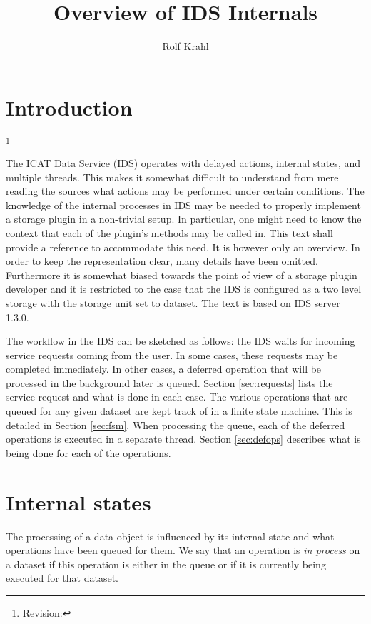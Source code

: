\documentclass[paper=a4]{scrartcl}
\title{Overview of IDS Internals}
\author{Rolf Krahl}
\newcommand{\revhint}{%
  \begingroup%
  \let\thefootnote\relax%
  \footnote{Revision: }%
  \addtocounter{footnote}{-1}%
  \endgroup%
}
\begin{document}
\maketitle

\section{Introduction}

\revhint{}%
The ICAT Data Service (IDS) operates with delayed actions, internal
states, and multiple threads.  This makes it somewhat difficult to
understand from mere reading the sources what actions may be performed
under certain conditions.  The knowledge of the internal processes in
IDS may be needed to properly implement a storage plugin in a
non-trivial setup.  In particular, one might need to know the context
that each of the plugin's methods may be called in.  This text shall
provide a reference to accommodate this need.  It is however only an
overview.  In order to keep the representation clear, many details
have been omitted.  Furthermore it is somewhat biased towards the
point of view of a storage plugin developer and it is restricted to
the case that the IDS is configured as a two level storage with the
storage unit set to dataset.  The text is based on IDS server 1.3.0.

The workflow in the IDS can be sketched as follows: the IDS waits for
incoming service requests coming from the user.  In some cases, these
requests may be completed immediately.  In other cases, a deferred
operation that will be processed in the background later is queued.
Section \ref{sec:requests} lists the service request and what is done
in each case.  The various operations that are queued for any given
dataset are kept track of in a finite state machine.  This is detailed
in Section \ref{sec:fsm}.  When processing the queue, each of the
deferred operations is executed in a separate thread.  Section
\ref{sec:defops} describes what is being done for each of the
operations.


\section{Internal states}
\label{sec:states}

The processing of a data object is influenced by its internal state
and what operations have been queued for them.  We say that an
operation is \emph{in process} on a dataset if this operation is
either in the queue or if it is currently being executed for that
dataset.
\end{document}
